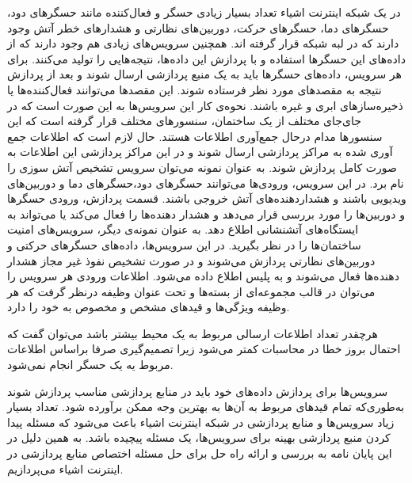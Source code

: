     در یک شبکه اینترنت اشیاء تعداد بسیار زیادی حسگر‌ و فعال‌کننده‌ مانند حسگر‌های دود، حسگر‌های دما، حسگر‌های حرکت، دوربین‌های نظارتی و هشدار‌های خطر آتش وجود دارند که در لبه شبکه قرار گرفته اند.
    همچنین سرویس‌های زیادی هم وجود دارند که از داده‌های این حسگر‌ها استفاده و با پردازش این داده‌ها، نتیجه‌هایی را تولید می‌کنند.
    برای هر سرویس، داده‌های حسگر‌ها باید به یک منبع پردازشی ارسال شوند و بعد از پردازش نتیجه به مقصد‌های مورد نظر فرستاده شوند.
    این مقصد‌ها می‌توانند فعال‌کننده‌ها یا ذخیره‌سازهای ابری و غیره باشند.
    نحوه‌ی کار این سرویس‌ها به این صورت است که در جای‌جای مختلف از یک ساختمان، سنسورهای مختلف قرار گرفته است که این سنسورها مدام درحال جمع‌آوری اطلاعات هستند. حال لازم است که اطلاعات جمع آوری شده به مراکز پردازشی ارسال شوند و در این مراکز پردازشی این اطلاعات به صورت کامل پردازش شوند.
    به عنوان نمونه می‌توان سرویس تشخیص آتش سوزی را نام برد.
    در این سرویس، ورودی‌ها می‌توانند حسگر‌های دود،حسگرهای دما و دوربین‌های ویدیویی باشند و هشداردهنده‌‌های آتش خروجی باشند.
    قسمت پردازش، ورودی حسگر‌ها و دوربین‌ها را مورد بررسی قرار می‌دهد و هشدار دهنده‌ها را فعال می‌کند یا می‌تواند به ایستگاه‌‌های آتشنشانی اطلاع دهد.  
    به عنوان نمونه‌ی دیگر، سرویس‌های امنیت ساختمان‌ها را در نظر بگیرید.
    در این سرویس‌ها، داده‌های حسگر‌های حرکتی و دوربین‌های نظارتی پردازش می‌شوند و در صورت تشخیص نفوذ غیر مجاز هشدار دهنده‌ها فعال می‌شوند و به پلیس اطلاع داده می‌شود.
    اطلاعات ورودی هر سرویس را می‌توان در قالب مجموعه‌ای از بسته‌ها و تحت عنوان وظیفه درنظر گرفت که هر وظیفه ویژگی‌ها و قیدهای مشخص و مخصوص به خود را دارد.
    
    هرچقدر تعداد اطلاعات ارسالی مربوط به یک محیط بیشتر باشد می‌توان گفت که احتمال بروز خطا در محاسبات کمتر می‌شود زیرا تصمیم‌گیری صرفا براساس اطلاعات مربوط یه یک حسگر انجام نمی‌شود.
    
    سرویس‌ها برای پردازش داده‌های خود باید در منابع پردازشی مناسب پردازش شوند به‌طوری‌که تمام قیدهای مربوط به آن‌ها به بهترین وجه ممکن برآورده شود. 
    تعداد بسیار زیاد سرویس‌ها و منابع پردازشی در شبکه اینترنت اشیاء باعث می‌شود که مسئله پیدا کردن منبع پردازشی بهینه برای سرویس‌ها، یک مسئله پیچیده باشد.
    به همین دلیل در این پایان نامه به بررسی و ارائه راه حل برای حل مسئله اختصاص منابع پردازشی در اینترنت اشیاء می‌پردازیم.


